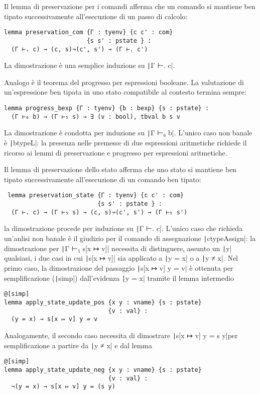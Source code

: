 Il lemma di preservazione per i comandi afferma che un comando si mantiene ben tipato successivamente all'esecuzione di un passo di calcolo:
\begin{verbatim}
lemma preservation_com {Γ : tyenv} {c c' : com} 
                       {s s' : pstate } :
  (Γ ⊢. c) → (c, s)↝(c', s') → (Γ ⊢. c')
\end{verbatim}
La dimostrazione è una semplice induzione su \texttt|Γ ⊢. c|.

Analogo è il teorema del progresso per espressioni booleane. La valutazione di un'espressione ben tipata in uno stato compatibile al contesto termina sempre:
\begin{verbatim}
lemma progress_bexp {Γ : tyenv} {b : bexp} {s : pstate} :
  (Γ ⊢₆ b) → (Γ ⊢₅ s) → ∃ (v : bool), tbval b s v
\end{verbatim}
La dimostrazione è condotta per induzione su \texttt|Γ ⊢₆ b|. L'unico caso non banale è \texttt|btypeL|: la presenza nelle premesse di due espressioni aritmetiche richiede il ricorso ai lemmi di preservazione e progresso per espressioni aritmetiche.

Il lemma di preservazione dello stato afferma che uno stato si mantiene ben tipato successivamente all'esecuzione di un comando ben tipato:
\begin{verbatim}
 lemma preservation_state {Γ : tyenv} {c c' : com} 
                          {s s' : pstate } :
  (Γ ⊢. c) → (Γ ⊢₅ s) → (c, s)↝(c', s') → (Γ ⊢₅ s')
\end{verbatim}
la dimostrazione procede per induzione su \texttt|Γ ⊢. c|. L'unico caso che richieda un'anlisi non banale è il giudizio per il comando di assegnazione \texttt|ctypeAssign|: la dimostrazione per \texttt|Γ ⊢₅ s[x ↦ v]| necessita di distinguere, assunto un \texttt|y| qualsiasi, i due casi in cui \texttt|s[x ↦ v]| sia applicato a \texttt|y = x| o a \texttt|y ≠ x|. Nel primo caso, la dimostrazione del passaggio \texttt|s[x ↦ v] y = v| è ottenuta per semplificazione (\texttt|simp|) dall'evidenza \texttt|y = x| tramite il lemma intermedio
\begin{verbatim}
@[simp] 
lemma apply_state_update_pos {x y : vname} {s : pstate} 
                             {v : val} :
  (y = x) → s[x ↦ v] y = v
\end{verbatim}
Analogamente, il secondo caso necessita di dimostrare \texttt|s[x ↦ v] y = s y|per semplificazione a partire da \texttt|y ≠ x| e dal lemma
\begin{verbatim}
@[simp] 
lemma apply_state_update_neg {x y : vname} {s : pstate} 
                             {v : val} :
  ¬(y = x) → s[x ↦ v] y = (s y)
\end{verbatim}

